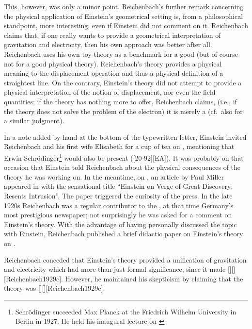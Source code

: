 \documentclass[draft]{article}
\begin{document}
This, however, was only a minor point. Reichenbach's further remark concerning the physical application of Einstein's geometrical setting is, from a philosophical standpoint, more interesting, even if Einstein did not comment on it. Reichenbach claims that, if one really wants to provide a geometrical interpretation of gravitation and electricity, then his own approach was better after all. Reichenbach uses his own toy-theory as a benchmark for a good  (but of course not for a good physical theory). Reichenbach's theory provides a physical meaning to the displacement operation and thus a physical definition of a straightest line. On the contrary, Einstein's theory did not attempt to provide a physical interpretation of the notion of displacement, nor even the field quantities; if the theory has nothing more to offer, Reichenbach claims, (i.e., if the theory does not solve the problem of the electron) it is merely a  (cf.\ also \cite{Eddington1929} for a similar judgment).

In a note added by hand at the bottom of the typewritten letter, Einstein invited Reichenbach and his first wife Elisabeth for a cup of tea on , mentioning that Erwin Schrödinger\footnote{Schrödinger succeeded Max Planck at the Friedrich Wilhelm University in Berlin in 1927. He held his inaugural lecture on  \citep{Schroedinger1929a}} would also be present ([20-92][EA]). It was probably on that occasion that Einstein told Reichenbach about the physical consequences of the theory he was working on. In the meantime, on , an article by Paul Miller appeared in  with the sensational title \enquote{Einstein on Verge of Great Discovery; Resents Intrusion}. The paper triggered the curiosity of the press. In the late 1920s Reichenbach was a regular contributor to the , at that time Germany's most prestigious newspaper; not surprisingly he was asked for a comment on Einstein's theory. With the advantage of having personally discussed the topic with Einstein, Reichenbach published a brief didactic paper on Einstein's theory on  \citep{Reichenbach1929c}. 





Reichenbach conceded that Einstein's theory provided a unification of gravitation and electricity which had more than just formal significance, since it made [][][Reichenbach1929c]. However, he maintained his skepticism by claiming that the theory was [][\me][Reichenbach1929c]. 
\end{document}
